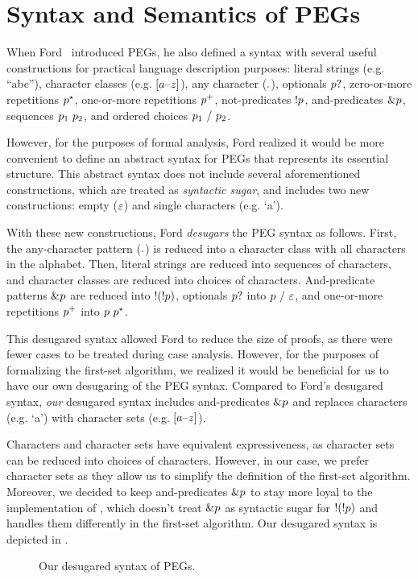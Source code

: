 \chapter{Syntax and Semantics of PEGs}
\label{chapter:pegs}

When Ford~\cite{ford_parsing_2004} introduced PEGs,
he also defined a syntax
with several useful constructions
for practical language description purposes:
literal strings (e.g. ``abc''),
character classes (e.g. $[a\text{--}z]$), any character ($.{}$),
optionals $p?$, zero-or-more repetitions $p^\star$,
one-or-more repetitions $p^+$, not-predicates $!p$,
and-predicates $\&p$, sequences $p_1\ p_2$,
and ordered choices $p_1\ /\ p_2$.

However, for the purposes of formal analysis,
Ford realized it would be more
convenient to define an abstract syntax for PEGs
that represents its essential structure.
This abstract syntax does not include
several aforementioned constructions,
which are treated as \emph{syntactic sugar},
and includes two new constructions:
empty ($\varepsilon$) and single characters (e.g. `a').

With these new constructions,
Ford \emph{desugars} the PEG syntax as follows.
First, the any-character pattern ($.{}$) is reduced
into a character class with all characters in the alphabet.
Then, literal strings are reduced into sequences of characters,
and character classes are reduced into choices of characters.
And-predicate patterns $\&p$ are reduced into $!(!p)$,
optionals $p?$ into $p\ /\ \varepsilon$,
and one-or-more repetitions $p^+$ into $p\ p^\star$.

This desugared syntax allowed Ford to reduce the size of proofs,
as there were fewer cases to be treated during case analysis.
However, for the purposes of formalizing the first-set algorithm,
we realized it would be beneficial for us to have our own
desugaring of the PEG syntax.
Compared to Ford's desugared syntax,
\emph{our} desugared syntax
includes and-predicates $\&p$
and replaces characters (e.g. `a')
with character sets (e.g. $[a\text{--}z]$).

Characters and character sets
have equivalent expressiveness,
as character sets can be reduced into choices of characters.
However, in our case, we prefer character sets as they allow us to
simplify the definition of the first-set algorithm.
Moreover, we decided to keep and-predicates $\&p$
to stay more loyal to the implementation of \lpeg{},
which doesn't treat $\&p$ as syntactic sugar for $!(!p)$
and handles them differently in the first-set algorithm.
Our desugared syntax is depicted in .
\begin{figure}[t]
    \centering
    
    \caption{Our desugared syntax of PEGs.}
    \label{fig:syntax}
\end{figure}


